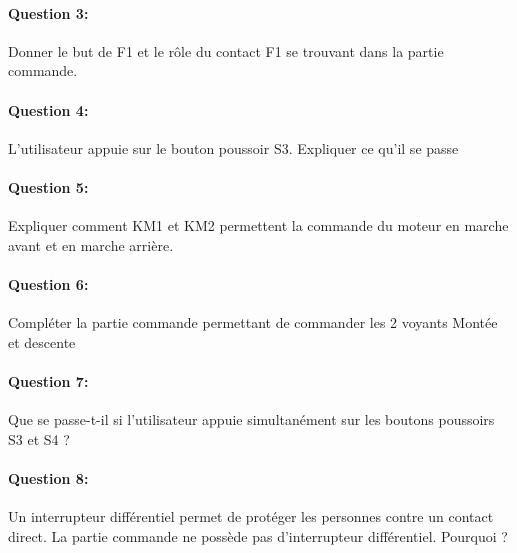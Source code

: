 \paragraph{Question 3:}

Donner le but de F1 et le rôle du contact F1 se trouvant dans la partie commande.

\paragraph{Question 4:}

L'utilisateur appuie sur le bouton poussoir S3. Expliquer ce qu'il se passe 

\paragraph{Question 5:}

Expliquer comment KM1 et KM2 permettent la commande du moteur en marche avant et en marche arrière.

\paragraph{Question 6:}

Compléter la partie commande permettant de commander les 2 voyants Montée et descente

\paragraph{Question 7:}

Que se passe-t-il si l'utilisateur appuie simultanément sur les boutons poussoirs S3 et S4 ?

\paragraph{Question 8:}

Un interrupteur différentiel permet de protéger les personnes contre un contact direct. La partie commande ne possède pas d'interrupteur différentiel. Pourquoi ?

\newpage

